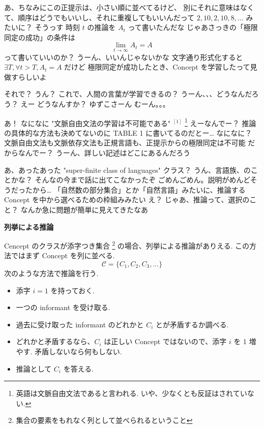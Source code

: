 \YUZUKO あ、ちなみにこの正提示は、小さい順に並べてるけど、
\YUZUKO 別にそれに意味はなくて、順序はどうでもいいし、それに重複してもいいんだって
\YUKARI $2, 10, 2, 10, 8, \ldots$ みたいに？
\YUZUKO そうっす
\YUI 時刻 $t$ の推論を $A_t$ って書いたんだな
\YUI じゃあさっきの「極限同定の成功」の条件は
$$\lim_{t \rightarrow \infty} A_t = A$$\vspace{-6mm}
\YUI って書いていいのか？
\YUZUKO うーん、いいんじゃないかな
\YUZUKO 文字通り形式化すると $\exists T, \forall t > T, A_t = A$ だけど
\YUZUKO 極限同定が成功したとき、Concept を学習したって見做すらしいよ

\PAUSE

\YUKARI それで？
\YUZUKO うん？
\YUKARI これで、人間の言葉が学習できるの？
\YUZUKO うーん、、、どうなんだろう？
\YUKARI えー
\YUI どうなんすか？ ゆずこさーん
\YUZUKO むーん。。。

\PAUSE

\YUZUKO あ！
\YUI なになに
\YUZUKO "文脈自由文法の学習は不可能である" ${}^{[1]}$ \footnote{英語は文脈自由文法であると言われる. いや、少なくとも反証はされていない.}
\YUKARI えーなんでー？
\YUI 推論の具体的な方法も決めてないのに
\YUZUKO TABLE 1 に書いてるのだとー…
\YUI なになに？
\YUZUKO 文脈自由文法も文脈依存文法も正規言語も、正提示からの極限同定は不可能
\YUKARI だからなんでー？
\YUZUKO うーん、詳しい記述はどこにあるんだろう

\PAUSE

\YUZUKO あ、あったあった
\YUZUKO "super-finite class of languages"
\YUKARI クラス？
\YUZUKO うん、言語族、のことかな？
\YUI そんなの今まで話に出てこなかったぞ
\YUZUKO ごめんごめん。説明がめんどそうだったから…
\YUZUKO 「自然数の部分集合」とか「自然言語」みたいに、推論するConcept を中から選べるための枠組みみたい
\YUKARI え？ じゃあ、推論って、選択のこと？
\YUI なんか急に問題が簡単に見えてきたなあ

\begin{boxnote}
    {\bf 列挙による推論}

    Cencept のクラスが添字つき集合 \footnote{集合の要素をもれなく列として並べられるということ} の場合、列挙による推論がありえる. この方法ではまず Concept を列に並べる.
    $$\mathcal{C} = \{ C_1, C_2, C_3, \ldots \}$$
    次のような方法で推論を行う.
    \begin{itemize}
        \setlength{\itemsep}{0mm}
        \item
            添字 $i=1$ を持っておく.
        \item
            一つの informant を受け取る.
        \item
            過去に受け取った informant のどれかと $C_i$ とが矛盾するか調べる.
        \item
            どれかと矛盾するなら、$C_i$ は正しい Concept ではないので、添字 $i$ を 1 増やす.
            矛盾しないなら何もしない.
        \item
            推論として $C_i$ を答える.
    \end{itemize}
\end{boxnote}

